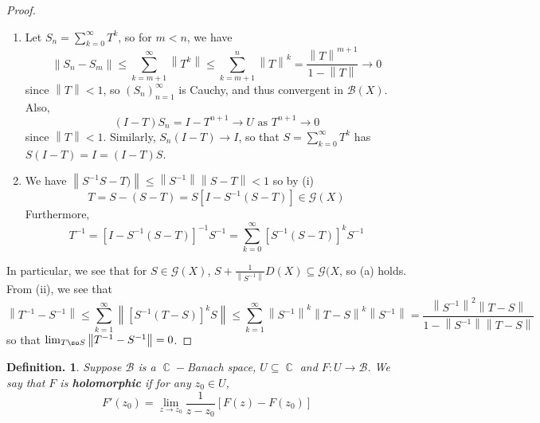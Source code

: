 \documentclass[11pt, a4paper]{memoir}
\DeclareMathOperator{\C}{{\mathbb{C}}}
\newcommand{\norm}[1]{\ensuremath{\left\lVert#1\right\rVert}}
\theoremstyle{change}
\theoremstyle{plain}
\theoremstyle{nonumberplain}
\newtheorem{definition}{Definition.}
\newtheorem{proof}{Proof}
\numberwithin{equation}{section}
\begin{document}
\begin{proof}
    \begin{enumerate}[nl,r]
        \item Let $S_n=\sum_{k=0}^\infty T^k$, so for $m<n$, we have
            \begin{equation*}
                \norm{S_n-S_m}\leq\sum_{k=m+1}^\infty\norm{T^k}\leq\sum_{k=m+1}^n\norm{T}^k=\frac{\norm{T}^{m+1}}{1-\norm{T}}\to 0
            \end{equation*}
            since $\norm{T}<1$, so $(S_n)_{n=1}^\infty$ is Cauchy, and thus convergent in $\mathcal{B}(X)$.
            Also,
            \begin{equation*}
                (I-T)S_n=I-T^{n+1}\to U\text{ as }T^{n+1}\to 0
            \end{equation*}
            since $\norm{T}<1$.
            Similarly, $S_n(I-T)\to I$, so that $S=\sum_{k=0}^\infty T^k$ has $S(I-T)=I=(I-T)S$.
        \item We have $\norm{S^{-1}S-T)}\leq\norm{S^{-1}}\norm{S-T}<1$ so by (i)
            \begin{equation*}
                T=S-(S-T)=S[I-S^{-1}(S-T)]\in\mathcal{G}(X)
            \end{equation*}
            Furthermore,
            \begin{equation*}
                T^{-1}=[I-S^{-1}(S-T)]^{-1}S^{-1}=\sum_{k=0}^\infty[S^{-1}(S-T)]^kS^{-1}
            \end{equation*}
    \end{enumerate}
    In particular, we see that for $S\in\mathcal{G}(X)$, $S+\frac{1}{\norm{S^{-1}}}D(X)\subseteq\mathcal{G}(X$, so (a) holds.
    From (ii), we see that
    \begin{equation*}
        \norm{T^{-1}-S^{-1}}\leq\sum_{k=1}^\infty\norm{[S^{-1}(T-S)]^kS}\leq\sum_{k=1}^\infty\norm{S^{-1}}^k\norm{T-S}^k\norm{S^{-1}}=\frac{\norm{S^{-1}}^2\norm{T-S}}{1-\norm{S^{-1}}\norm{T-S}}
    \end{equation*}
    so that $\lim_{T\so S}\norm{T^{-1}-S^{-1}}=0$.
\end{proof}
\begin{definition}
    Suppose $\mathcal{B}$ is a $\C-$Banach space, $U\subseteq\C$ and $F:U\to\mathcal{B}$.
    We say that $F$ is \textbf{holomorphic} if for any $z_0\in U$,
    \begin{equation*}
        F'(z_0)=\lim_{z\to z_0}\frac{1}{z-z_0}[F(z)-F(z_0)]
    \end{equation*}
\end{definition}
\end{document}
